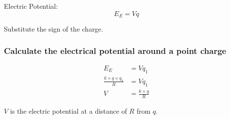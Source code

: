 Electric Potential:
\begin{equation}
    E_E = Vq
\end{equation}
\begin{remark}
    Substitute the sign of the charge.
\end{remark}

\subsubsection{Calculate the electrical potential around a point charge}
\begin{align}
    E_E &= Vq_1 \nonumber \\
    \frac{k \times q \times q_1}{R} &= Vq_1 \nonumber \\
    V &= \frac{k \times q}{R}
\end{align}
\begin{center}
    $V$ is the electric potential at a distance of $R$ from $q$.
\end{center}
